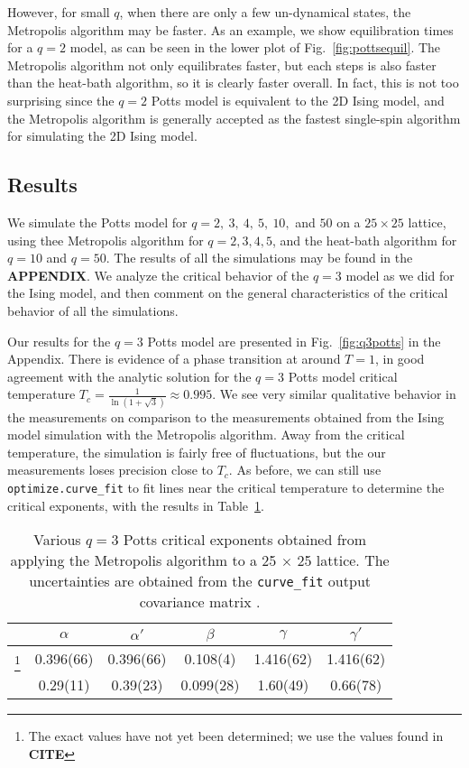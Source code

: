 \documentclass[twocolumn,aps,prl]{revtex4-1} %
\begin{document}
However, for small $q$, when there are only a few un-dynamical states, the Metropolis algorithm may be faster. As an example, we show equilibration times for a $q = 2$ model, as can be seen in the lower plot of Fig.~\ref{fig:pottsequil}. The Metropolis algorithm not only equilibrates faster, but each steps is also faster than the heat-bath algorithm, so it is clearly faster overall. In fact, this is not too surprising since the $q = 2$ Potts model is equivalent to the 2D Ising model, and the Metropolis algorithm is generally accepted as the fastest single-spin algorithm for simulating the 2D Ising model. 

\subsection{Results}
We simulate the Potts model for $q = 2,\ 3,\ 4,\ 5,\ 10,$ and $50$ on a $25 \times 25$ lattice, using thee Metropolis algorithm for $q = 2, 3, 4, 5$, and the heat-bath algorithm for $q = 10$ and $q = 50$. The results of all the simulations may be found in the \textbf{APPENDIX}. We analyze the critical behavior of the $q = 3$ model as we did for the Ising model, and then comment on the general characteristics of the critical behavior of all the simulations.

Our results for the $q = 3$ Potts model are presented in Fig.~\ref{fig:q3potts} in the Appendix. There is evidence of a phase transition at around $T = 1$, in good agreement with the analytic solution for the $q = 3$ Potts model critical temperature $T_c = \frac{1}{\ln(1+\sqrt{3})} \approx 0.995$. We see very similar qualitative behavior in the measurements on comparison to the measurements obtained from the Ising model simulation with the Metropolis algorithm. Away from the critical temperature, the simulation is fairly free of fluctuations, but the our measurements loses precision close to $T_c$. As before, we can still use \texttt{optimize.curve\_fit} to fit lines near the critical temperature to determine the critical exponents, with the results in Table~\ref{tab:potts}.
\begin{table}[b]
	\caption{\label{tab:potts}Various $q = 3$ Potts critical exponents obtained from applying the Metropolis algorithm to a 25 $\times$ 25 lattice. The uncertainties are obtained from the \texttt{curve\_fit} output covariance matrix .}
	\begin{ruledtabular}
		\begin{tabular}{cccccc}
			& $\alpha$ & $\alpha'$ & $\beta$ & $\gamma$ & $\gamma'$ \\
			\hline 
			\text{Analytic}\footnote{The exact values have not yet been determined; we use the values found in \textbf{CITE}} & 0.396(66) & 0.396(66) & 0.108(4) & 1.416(62) & 1.416(62) \\
			\text{MC 25} &  0.29(11) & 0.39(23) & 0.099(28) & 1.60(49) & 0.66(78)
		\end{tabular}
	\end{ruledtabular}
\end{table}
\end{document}
